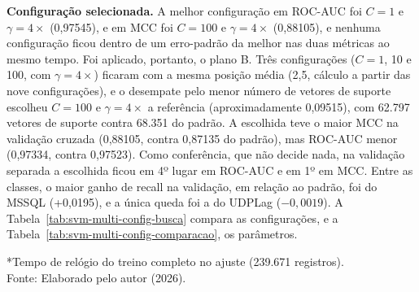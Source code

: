 \documentclass[
    12pt,                %
    openright,           %
    oneside,             %
    a4paper,             %
    english,             %
    brazil               %
]{abntex2}
\begin{document}
\textbf{Configuração selecionada.} A melhor configuração em ROC-AUC foi $C = 1$ e $\gamma = 4\times$ (0,97545), e em MCC foi $C = 100$ e $\gamma = 4\times$ (0,88105), e nenhuma configuração ficou dentro de um erro-padrão da melhor nas duas métricas ao mesmo tempo. Foi aplicado, portanto, o plano B. Três configurações ($C = 1$, 10 e 100, com $\gamma = 4\times$) ficaram com a mesma posição média (2,5, cálculo a partir das nove configurações), e o desempate pelo menor número de vetores de suporte escolheu $C = 100$ e $\gamma = 4\times$ a referência (aproximadamente 0,09515), com 62.797 vetores de suporte contra 68.351 do padrão. A escolhida teve o maior MCC na validação cruzada (0,88105, contra 0,87135 do padrão), mas ROC-AUC menor (0,97334, contra 0,97523). Como conferência, que não decide nada, na validação separada a escolhida ficou em 4º lugar em ROC-AUC e em 1º em MCC. Entre as classes, o maior ganho de recall na validação, em relação ao padrão, foi do MSSQL (+0,0195), e a única queda foi a do UDPLag ($-0{,}0019$). A Tabela~\ref{tab:svm-multi-config-busca} compara as configurações, e a Tabela~\ref{tab:svm-multi-config-comparacao}, os parâmetros.
 
\begin{table}
\centering
\caption{Configurações do SVM multiclasse comparadas na busca}
\label{tab:svm-multi-config-busca}
\footnotesize
{}
\par\smallskip
*Tempo de relógio do treino completo no ajuste (239.671 registros).\\
Fonte: Elaborado pelo autor (2026).
\end{table}
 
\end{document}
